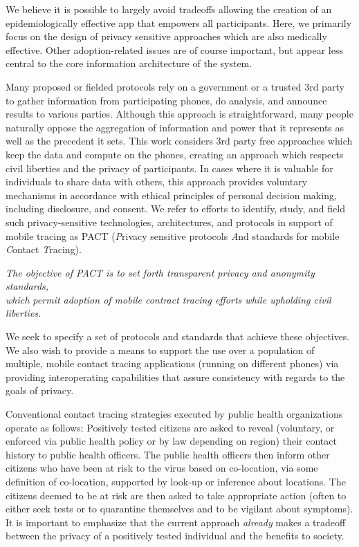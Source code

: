 \documentclass{article}
\begin{document}
We believe it is possible to largely avoid tradeoffs allowing the creation of an  epidemiologically effective app that empowers all participants.  Here, we primarily focus on the design of privacy sensitive approaches which are also medically effective.  Other adoption-related issues are of course important, but appear less central to the core information architecture of the system. 
\fi

Many proposed or fielded protocols rely on a government or a trusted 3rd party to gather  information from participating phones, do analysis, and announce results to various parties.  Although this approach is straightforward, many people naturally oppose the aggregation of information and power that it represents as well as the precedent it sets. 
This work considers 3rd party free approaches which keep the data and compute on the phones, creating an approach which respects civil liberties and the privacy of participants.  In cases where it is valuable for individuals to share data with others, this approach provides voluntary mechanisms in accordance with ethical principles of personal decision making, including disclosure, and consent.  We refer to efforts to identify, study, and field such privacy-sensitive technologies, architectures, and protocols in support of mobile tracing as PACT (\emph{P}rivacy sensitive protocols \emph{A}nd standards for mobile \emph{C}ontact \emph{T}racing).

\begin{center}
\emph{The objective of PACT is to set forth transparent privacy and
  anonymity standards,\\
  which permit adoption of mobile contract tracing efforts while upholding civil liberties.}
\end{center}

We seek to specify a set of protocols and standards that achieve
these objectives. We also wish to provide a means to support the use over a population of multiple, mobile contact tracing applications (running on different phones) via providing interoperating capabilities that assure consistency with regards to the goals of privacy. 

Conventional contact tracing strategies executed by public health organizations operate as follows: Positively tested citizens are asked to reveal (voluntary, or enforced via public health policy or by law depending on region) their contact history to public health officers. The public health officers then inform other citizens who have been at risk to the virus based on co-location, via some definition of co-location, supported by look-up or inference about locations. The citizens deemed to be at risk are then asked to take appropriate action (often to either seek tests or to quarantine
themselves and to be vigilant about symptoms).  It is important to emphasize that the current approach \emph{already} makes a tradeoff between the privacy of a positively tested individual and the benefits to society.
\end{document}
